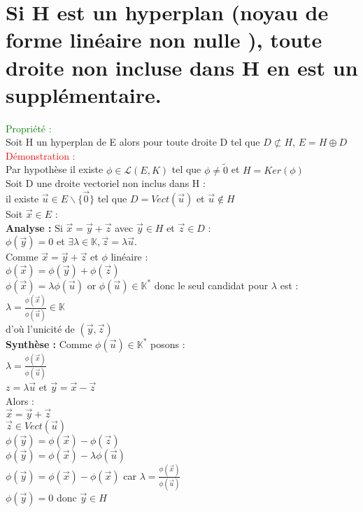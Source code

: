 \documentclass{article}
\begin{document}
\section{Si H est un hyperplan (noyau de forme linéaire non nulle ), toute droite non incluse dans H en est un supplémentaire.}
\textcolor{green}{Propriété :} \\ 
Soit H un hyperplan de E alors pour toute droite D tel que $D\not\subset H$, $E= H \oplus D$ \\ 
\textcolor{red}{Démonstration :} \\ 
Par hypothèse il existe $\phi \in \mathcal{L}(E,K)$ tel que $\phi \neq \tilde{0}$ et $H=Ker(\phi)$ \\ 
Soit D une droite vectoriel non inclus dans H : \\ 
il existe $\vec{u} \in E \backslash \lbrace \vec{0} \rbrace$ tel que $D=Vect(\vec{u})$ et $\vec{u} \notin H$ \\ 
Soit $\vec{x} \in E$ : \\ 
{\bf Analyse :} Si $\vec{x}=\vec{y}+ \vec{z}$ avec $\vec{y} \in H$ et $\vec{z} \in D$ :\\ 
$\phi(\vec{y})=0$ et $\exists \lambda \in \mathbb{K}, \vec{z}= \lambda \vec{u}$. \\ 
Comme $\vec{x} =\vec{y}+ \vec{z}$ et $\phi$ linéaire : \\ 
$\phi(\vec{x})=\phi(\vec{y})+ \phi(\vec{z})$ \\ 
$\phi(\vec{x})=\lambda \phi(\vec{u})$
or $\phi(\vec{u}) \in \mathbb{K}^*$ donc le seul candidat pour $\lambda$ est : \\ 
$\lambda= \frac{\phi(\vec{x})}{\phi(\vec{u})} \in \mathbb{K}$ \\ 
d'où l'unicité de $(\vec{y}, \vec{z})$ \\ 
{\bf Synthèse :} Comme $\phi(\vec{u}) \in  \mathbb{K}^*$ posons : \\ 
$\lambda= \frac{\phi(\vec{x})}{\phi(\vec{u})}$ \\ 
$z= \lambda \vec u$ et $\vec y =\vec x - \vec z$ \\ 
Alors : \\ 
$ \vec x = \vec y + \vec z$ \\ 
$\vec z \in Vect(\vec u)$ \\ 
$\phi(\vec y)= \phi(\vec x) - \phi (\vec z)$ \\ 
$\phi(\vec y) =\phi (\vec x) - \lambda \phi(\vec u)$ \\ 
$\phi(\vec y) =\phi (\vec x) - \phi (\vec x)$ car $\lambda=\frac{\phi(\vec{x})}{\phi(\vec{u})}$ \\ 
$\phi(\vec y)= 0$  donc $\vec y \in H$
\end{document}
